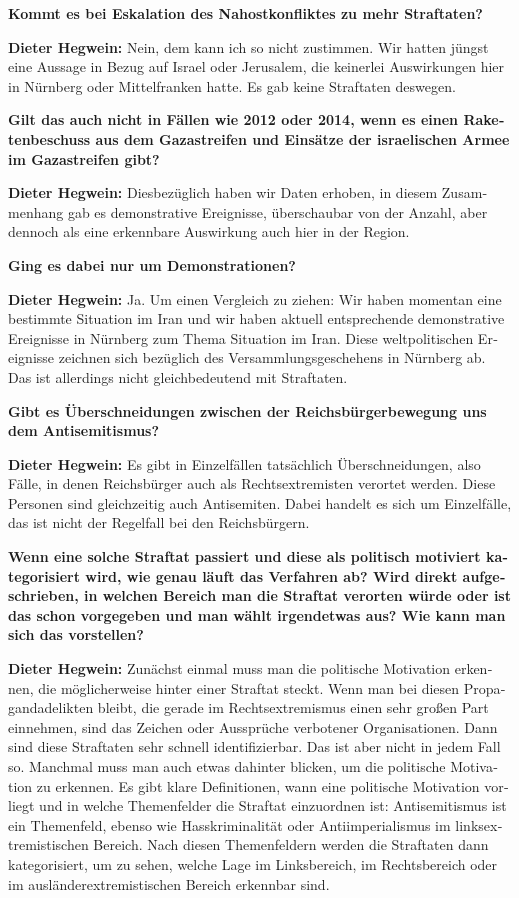 \begin{otherlanguage}{ngerman}
\textbf{Kommt es bei Eskalation des Nahostkonfliktes zu mehr Straftaten?}

\textbf{Dieter Hegwein:} Nein, dem kann ich so nicht zustimmen. Wir hatten jüngst eine Aussage in Bezug auf Israel oder Jerusalem, die keinerlei Auswirkungen hier in Nürnberg oder Mittelfranken hatte. Es gab keine Straftaten deswegen. 

\textbf{Gilt das auch nicht in Fällen wie 2012 oder 2014, wenn es einen Raketenbeschuss aus dem Gazastreifen und Einsätze der israelischen Armee im Gazastreifen gibt?}

\textbf{Dieter Hegwein:} Diesbezüglich haben wir Daten erhoben, in diesem Zusammenhang gab es demonstrative Ereignisse, überschaubar von der Anzahl, aber dennoch als eine erkennbare Auswirkung auch hier in der Region.

\textbf{Ging es dabei nur um Demonstrationen?} 

\textbf{Dieter Hegwein:} Ja. Um einen Vergleich zu ziehen: Wir haben momentan eine bestimmte Situation im Iran und wir haben aktuell entsprechende demonstrative Ereignisse in Nürnberg zum Thema Situation im Iran. Diese weltpolitischen Ereignisse zeichnen sich bezüglich des Versammlungsgeschehens in Nürnberg ab. Das ist allerdings nicht gleichbedeutend mit Straftaten.

\textbf{Gibt es Überschneidungen zwischen der Reichsbürgerbewegung uns dem Antisemitismus?}

\textbf{Dieter Hegwein:} Es gibt in Einzelfällen tatsächlich Überschneidungen, also Fälle, in denen Reichsbürger auch als Rechtsextremisten verortet werden. Diese Personen sind gleichzeitig auch Antisemiten. Dabei handelt es sich um Einzelfälle, das ist nicht der Regelfall bei den Reichsbürgern.

\textbf{Wenn eine solche Straftat passiert und diese als politisch motiviert kategorisiert wird, wie genau läuft das Verfahren ab? Wird direkt aufgeschrieben, in welchen Bereich man die Straftat verorten würde oder ist das schon vorgegeben und man wählt irgendetwas aus? Wie kann man sich das vorstellen?}

\textbf{Dieter Hegwein:}  Zunächst einmal muss man die politische Motivation erkennen, die möglicherweise hinter einer Straftat steckt. Wenn man bei diesen Propagandadelikten bleibt, die gerade im Rechtsextremismus einen sehr großen Part einnehmen, sind das Zeichen oder Aussprüche verbotener Organisationen. Dann sind diese Straftaten sehr schnell identifizierbar. Das ist aber nicht in jedem Fall so. Manchmal muss man auch etwas dahinter blicken, um die politische Motivation zu erkennen. Es gibt klare Definitionen, wann eine politische Motivation vorliegt und in welche Themenfelder die Straftat einzuordnen ist: Antisemitismus ist ein Themenfeld, ebenso wie Hasskriminalität oder Antiimperialismus im linksextremistischen Bereich. Nach diesen Themenfeldern werden die Straftaten dann kategorisiert, um zu sehen, welche Lage im Linksbereich, im Rechtsbereich oder im ausländerextremistischen Bereich erkennbar sind.


\end{otherlanguage}
